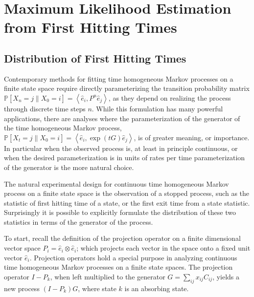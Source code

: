 \chapter{Maximum Likelihood Estimation from First Hitting Times}
\section{Distribution of First Hitting Times}
Contemporary methods for fitting time homogeneous Markov processes on a finite 
state space require directly parameterizing the transition probability matrix $\mathbb{P}\left[X_n = j \left\|X_0 = i \right.\right] = \left\langle \hat{e}_i, P^n \hat{e}_j \right\rangle$,
as they depend on realizing the process through discrete time steps $n$. While this 
formulation has many powerful applications, there are analyses where the parameterization of 
the generator of the time homogeneous Markov process, $\mathbb{P}\left[X_t = j \left\|X_0 = i \right.\right] = \left\langle \hat{e}_i, \exp\left({tG}\right) \hat{e}_j \right\rangle$, 
is of greater meaning, or importance. In particular when the observed process is, at least
in principle continuous, or when the desired parameterization is in units of rates per time
parameterization of the generator is the more natural choice.

The natural experimental design for continuous time homogeneous Markov process on a finite
state space is the observation of a stopped process, such as the statistic of first hitting 
time of a state, or the first exit time from a state statistic. Surprisingly it is possible
to explicitly formulate the distribution of these two statistics in terms of the generator
of the process.

To start, recall the definition of the projection operator on a finite dimensional vector
space $P_i = \hat{e}_i \otimes \hat{e}_i$; which projects each vector in the space onto a
fixed unit vector $\hat{e}_i$. Projection operators hold a special purpose in analyzing
continuous time homogeneous Markov processes on a finite state spaces. The projection
operator $I-P_k$, when left multiplied to the generator $G = \sum_{ij}x_{ij}C_{ij}$, yields 
a new process $\left(I-P_k\right)G$, where state $k$ is an absorbing state.

